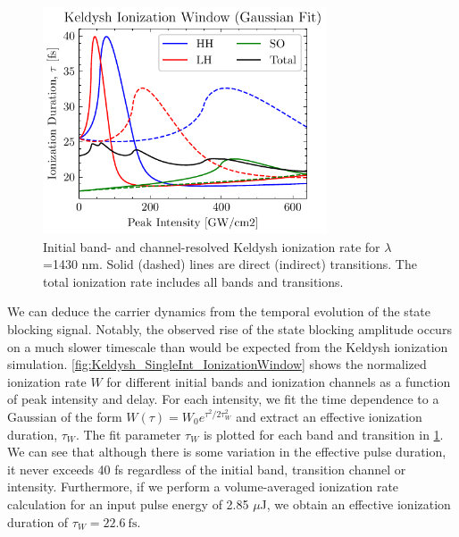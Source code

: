 \begin{figure}
	\centering
	\includegraphics[width=0.75\textwidth]{figures/chap4/Keldysh_SingleInt_IonizationWindowFit.pdf}
	\caption{Initial band- and channel-resolved Keldysh ionization rate for $\lambda$=1430 nm. Solid (dashed) lines are direct (indirect) transitions. The total ionization rate includes all bands and transitions.}
	\label{fig:Keldysh_SingleInt_IonizationWindowFit}
\end{figure}

We can deduce the carrier dynamics from the temporal evolution of the state blocking signal. Notably, the observed rise of the state blocking amplitude occurs on a much slower timescale than would be expected from the Keldysh ionization simulation. \cref{fig:Keldysh_SingleInt_IonizationWindow} shows the normalized ionization rate $W$ for different initial bands and ionization channels as a function of peak intensity and delay. For each intensity, we fit the time dependence to a Gaussian of the form ${W(\tau)=W_0 e^{\tau^2/2\tau_W^2}}$ and extract an effective ionization duration, $\tau_W$. The fit parameter $\tau_W$ is plotted for each band and transition in \cref{fig:Keldysh_SingleInt_IonizationWindowFit}. We can see that although there is some variation in the effective pulse duration, it never exceeds 40 fs regardless of the initial band, transition channel or intensity. Furthermore, if we perform a volume-averaged ionization rate calculation for an input pulse energy of 2.85 $\mu$J, we obtain an effective ionization duration of $\tau_W = 22.6 \ \textrm{fs}$.

